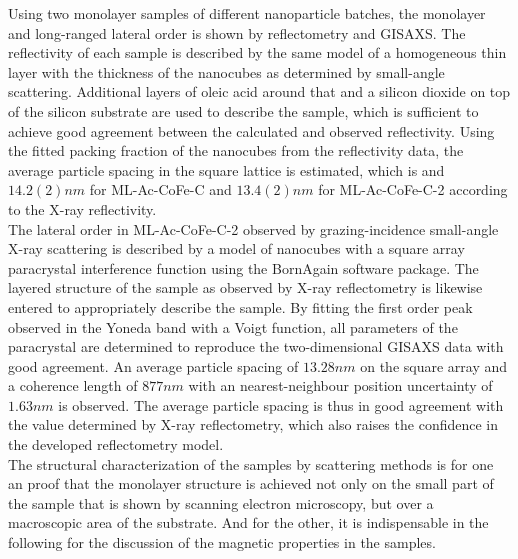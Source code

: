 \documentclass[\main/dresen_thesis.tex]{subfiles}
\begin{document}
  \label{sec:monolayers:structuralCharacterization:summary}
  Using two monolayer samples of different nanoparticle batches, the monolayer and long-ranged lateral order is shown by reflectometry and GISAXS.
  The reflectivity of each sample is described by the same model of a homogeneous thin layer with the thickness of the nanocubes as determined by small-angle scattering.
  Additional layers of oleic acid around that and a silicon dioxide on top of the silicon substrate are used to describe the sample, which is sufficient to achieve good agreement between the calculated and observed reflectivity.
  Using the fitted packing fraction of the nanocubes from the reflectivity data, the average particle spacing in the square lattice is estimated, which is and $14.2(2) \unit{nm}$ for ML-Ac-CoFe-C and $13.4(2) \unit{nm}$ for ML-Ac-CoFe-C-2 according to the X-ray reflectivity.
  \\

  The lateral order in ML-Ac-CoFe-C-2 observed by grazing-incidence small-angle X-ray scattering is described by a model of nanocubes with a square array paracrystal interference function using the BornAgain software package.
  The layered structure of the sample as observed by X-ray reflectometry is likewise entered to appropriately describe the sample.
  By fitting the first order peak observed in the Yoneda band with a Voigt function, all parameters of the paracrystal are determined to reproduce the two-dimensional GISAXS data with good agreement.
  An average particle spacing of $13.28 \unit{nm}$ on the square array and a coherence length of $877 \unit{nm}$ with an nearest-neighbour position uncertainty of $1.63 \unit{nm}$ is observed.
  The average particle spacing is thus in good agreement with the value determined by X-ray reflectometry, which also raises the confidence in the developed reflectometry model.
  \\

  The structural characterization of the samples by scattering methods is for one an proof that the monolayer structure is achieved not only on the small part of the sample that is shown by scanning electron microscopy, but over a macroscopic area of the substrate.
  And for the other, it is indispensable in the following for the discussion of the magnetic properties in the samples.
\end{document}
